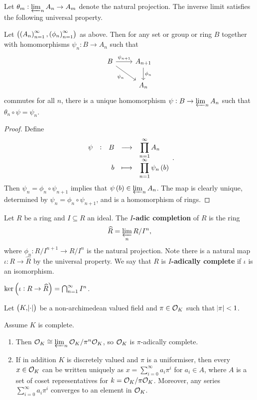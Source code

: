 Let $ \theta_m : \varprojlim_n A_n \to A_m $ denote the natural projection. The inverse limit satisfies the following universal property.

\begin{proposition}
Let $ \br{\br{A_n}_{n = 1}^\infty, \br{\phi_n}_{n = 1}^\infty} $ as above. Then for any set or group or ring $ B $ together with homomorphisms $ \psi_n : B \to A_n $ such that
$$
\begin{tikzcd}
B \arrow{r}{\psi_{n + 1}} \arrow{dr}[swap]{\psi_n} & A_{n + 1} \arrow{d}{\phi_n} \\
& A_n
\end{tikzcd}
$$
commutes for all $ n $, there is a unique homomorphism $ \psi : B \to \varprojlim_n A_n $ such that $ \theta_n \circ \psi = \psi_n $.
\end{proposition}

\begin{proof}
Define
$$ \function[\psi]{B}{\prod_{n = 1}^\infty A_n}{b}{\prod_{n = 1}^\infty \psi_n\br{b}}. $$
Then $ \psi_n = \phi_n \circ \psi_{n + 1} $ implies that $ \psi\br{b} \in \varprojlim_n A_n $. The map is clearly unique, determined by $ \psi_n = \phi_n \circ \psi_{n + 1} $, and is a homomorphism of rings.
\end{proof}

\pagebreak

\begin{definition}
Let $ R $ be a ring and $ I \subseteq R $ an ideal. The \textbf{$ I $-adic completion} of $ R $ is the ring
$$ \widehat{R} = \varprojlim_n R / I^n, $$
where $ \phi_n : R / I^{n + 1} \to R / I^n $ is the natural projection. Note there is a natural map $ \iota : R \to \widehat{R} $ by the universal property. We say that $ R $ is \textbf{$ I $-adically complete} if $ \iota $ is an isomorphism.
\end{definition}

\begin{fact*}
$ \ker \br{\iota : R \to \widehat{R}} = \bigcap_{n = 1}^\infty I^n $.
\end{fact*}

Let $ \br{K, \abs{\cdot}} $ be a non-archimedean valued field and $ \pi \in \mathcal{O}_K $ such that $ \abs{\pi} < 1 $.

\begin{proposition}
\label{prop:3.5}
Assume $ K $ is complete.
\begin{enumerate}
\item Then $ \mathcal{O}_K \cong \varprojlim_n \mathcal{O}_K / \pi^n\mathcal{O}_K $, so $ \mathcal{O}_K $ is $ \pi $-adically complete.
\item If in addition $ K $ is discretely valued and $ \pi $ is a uniformiser, then every $ x \in \mathcal{O}_K $ can be written uniquely as $ x = \sum_{i = 0}^\infty a_i\pi^i $ for $ a_i \in A $, where $ A $ is a set of coset representatives for $ k = \mathcal{O}_K / \pi\mathcal{O}_K $. Moreover, any series $ \sum_{i = 0}^\infty a_i\pi^i $ converges to an element in $ \mathcal{O}_K $.
\end{enumerate}
\end{proposition}


